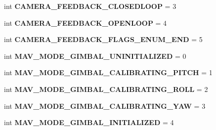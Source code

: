 \begin{DoxyCompactItemize}
int {\bfseries C\+A\+M\+E\+R\+A\+\_\+\+F\+E\+E\+D\+B\+A\+C\+K\+\_\+\+C\+L\+O\+S\+E\+D\+L\+O\+OP} = 3
\item 
\mbox{\label{namespacepymavlink_1_1dialects_1_1v10_aa55bb845ab976fe4d358f578473c9e4e}} 
int {\bfseries C\+A\+M\+E\+R\+A\+\_\+\+F\+E\+E\+D\+B\+A\+C\+K\+\_\+\+O\+P\+E\+N\+L\+O\+OP} = 4
\item 
\mbox{\label{namespacepymavlink_1_1dialects_1_1v10_a58c0939a34c47cdfc5a26058bdfa0846}} 
int {\bfseries C\+A\+M\+E\+R\+A\+\_\+\+F\+E\+E\+D\+B\+A\+C\+K\+\_\+\+F\+L\+A\+G\+S\+\_\+\+E\+N\+U\+M\+\_\+\+E\+ND} = 5
\item 
\mbox{\label{namespacepymavlink_1_1dialects_1_1v10_a0635ec231e0db24408ffcb2c297ca8da}} 
int {\bfseries M\+A\+V\+\_\+\+M\+O\+D\+E\+\_\+\+G\+I\+M\+B\+A\+L\+\_\+\+U\+N\+I\+N\+I\+T\+I\+A\+L\+I\+Z\+ED} = 0
\item 
\mbox{\label{namespacepymavlink_1_1dialects_1_1v10_a0df733370a7d242cc322ca5d2b7c7651}} 
int {\bfseries M\+A\+V\+\_\+\+M\+O\+D\+E\+\_\+\+G\+I\+M\+B\+A\+L\+\_\+\+C\+A\+L\+I\+B\+R\+A\+T\+I\+N\+G\+\_\+\+P\+I\+T\+CH} = 1
\item 
\mbox{\label{namespacepymavlink_1_1dialects_1_1v10_a62c7698be76d6548d764a8669a059773}} 
int {\bfseries M\+A\+V\+\_\+\+M\+O\+D\+E\+\_\+\+G\+I\+M\+B\+A\+L\+\_\+\+C\+A\+L\+I\+B\+R\+A\+T\+I\+N\+G\+\_\+\+R\+O\+LL} = 2
\item 
\mbox{\label{namespacepymavlink_1_1dialects_1_1v10_a062600be3b8779ee2be5ffe7e69a35fb}} 
int {\bfseries M\+A\+V\+\_\+\+M\+O\+D\+E\+\_\+\+G\+I\+M\+B\+A\+L\+\_\+\+C\+A\+L\+I\+B\+R\+A\+T\+I\+N\+G\+\_\+\+Y\+AW} = 3
\item 
\mbox{\label{namespacepymavlink_1_1dialects_1_1v10_a9df744854df1e04e0c530e835893f693}} 
int {\bfseries M\+A\+V\+\_\+\+M\+O\+D\+E\+\_\+\+G\+I\+M\+B\+A\+L\+\_\+\+I\+N\+I\+T\+I\+A\+L\+I\+Z\+ED} = 4
\item 
\mbox{\label{namespacepymavlink_1_1dialects_1_1v10_ae91a811c8e998ba603d06f149c6edda8}} 

\end{DoxyCompactItemize}
